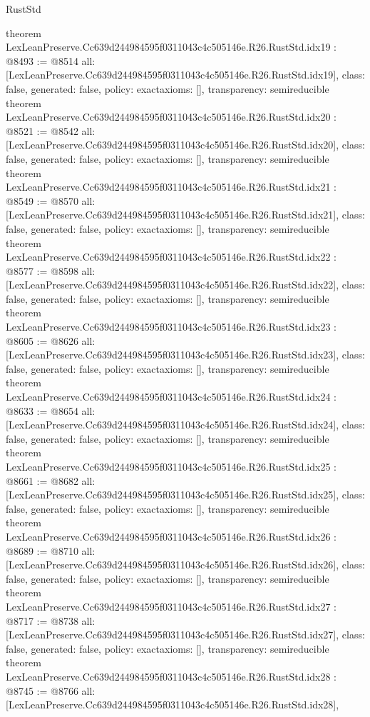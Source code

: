 \begin{lexlean}{RustStd}
\begin{coremodule}
{}
theorem LexLeanPreserve.Cc639d244984595f0311043c4c505146e.R26.RustStd.idx19 : @8493 := @8514 {
  all: [LexLeanPreserve.Cc639d244984595f0311043c4c505146e.R26.RustStd.idx19],
  class: false,
  generated: false,
  policy: exact{axioms: []},
  transparency: semireducible
}
theorem LexLeanPreserve.Cc639d244984595f0311043c4c505146e.R26.RustStd.idx20 : @8521 := @8542 {
  all: [LexLeanPreserve.Cc639d244984595f0311043c4c505146e.R26.RustStd.idx20],
  class: false,
  generated: false,
  policy: exact{axioms: []},
  transparency: semireducible
}
theorem LexLeanPreserve.Cc639d244984595f0311043c4c505146e.R26.RustStd.idx21 : @8549 := @8570 {
  all: [LexLeanPreserve.Cc639d244984595f0311043c4c505146e.R26.RustStd.idx21],
  class: false,
  generated: false,
  policy: exact{axioms: []},
  transparency: semireducible
}
theorem LexLeanPreserve.Cc639d244984595f0311043c4c505146e.R26.RustStd.idx22 : @8577 := @8598 {
  all: [LexLeanPreserve.Cc639d244984595f0311043c4c505146e.R26.RustStd.idx22],
  class: false,
  generated: false,
  policy: exact{axioms: []},
  transparency: semireducible
}
theorem LexLeanPreserve.Cc639d244984595f0311043c4c505146e.R26.RustStd.idx23 : @8605 := @8626 {
  all: [LexLeanPreserve.Cc639d244984595f0311043c4c505146e.R26.RustStd.idx23],
  class: false,
  generated: false,
  policy: exact{axioms: []},
  transparency: semireducible
}
theorem LexLeanPreserve.Cc639d244984595f0311043c4c505146e.R26.RustStd.idx24 : @8633 := @8654 {
  all: [LexLeanPreserve.Cc639d244984595f0311043c4c505146e.R26.RustStd.idx24],
  class: false,
  generated: false,
  policy: exact{axioms: []},
  transparency: semireducible
}
theorem LexLeanPreserve.Cc639d244984595f0311043c4c505146e.R26.RustStd.idx25 : @8661 := @8682 {
  all: [LexLeanPreserve.Cc639d244984595f0311043c4c505146e.R26.RustStd.idx25],
  class: false,
  generated: false,
  policy: exact{axioms: []},
  transparency: semireducible
}
theorem LexLeanPreserve.Cc639d244984595f0311043c4c505146e.R26.RustStd.idx26 : @8689 := @8710 {
  all: [LexLeanPreserve.Cc639d244984595f0311043c4c505146e.R26.RustStd.idx26],
  class: false,
  generated: false,
  policy: exact{axioms: []},
  transparency: semireducible
}
theorem LexLeanPreserve.Cc639d244984595f0311043c4c505146e.R26.RustStd.idx27 : @8717 := @8738 {
  all: [LexLeanPreserve.Cc639d244984595f0311043c4c505146e.R26.RustStd.idx27],
  class: false,
  generated: false,
  policy: exact{axioms: []},
  transparency: semireducible
}
theorem LexLeanPreserve.Cc639d244984595f0311043c4c505146e.R26.RustStd.idx28 : @8745 := @8766 {
  all: [LexLeanPreserve.Cc639d244984595f0311043c4c505146e.R26.RustStd.idx28],
}
\end{coremodule}
\end{lexlean}
